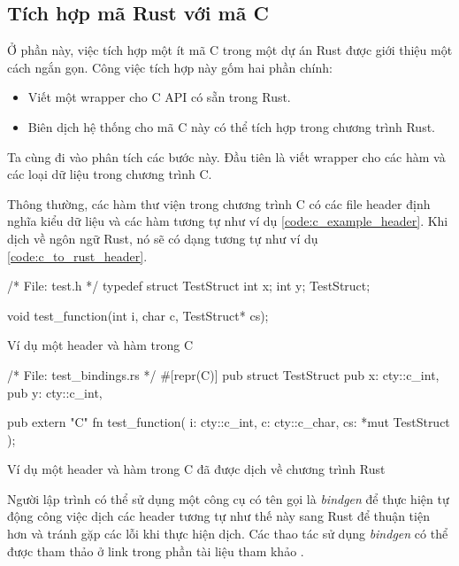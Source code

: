 \subsection{Tích hợp mã Rust với mã C}
Ở phần này, việc tích hợp một ít mã C trong một dự án Rust được giới thiệu một cách ngắn gọn.
Công việc tích hợp này gốm hai phần chính:
\begin{itemize}
\item Viết một wrapper cho C API có sẵn trong Rust.
\item Biên dịch hệ thống cho mã C này có thể tích hợp trong chương trình Rust.
\end{itemize}

Ta cùng đi vào phân tích các bước này.
Đầu tiên là viết wrapper cho các hàm và các loại dữ liệu trong chương trình C.

Thông thường, các hàm thư viện trong chương trình C có các file header định nghĩa kiểu dữ liệu và các hàm tương tự như ví dụ \ref{code:c_example_header}.
Khi dịch về ngôn ngữ Rust, nó sẽ có dạng tương tự như ví dụ \ref{code:c_to_rust_header}.
\begin{listing}
\begin{ccode}
/* File: test.h */
typedef struct TestStruct {
    int x;
    int y;
} TestStruct;

void test_function(int i, char c, TestStruct* cs);
\end{ccode}
\caption{Ví dụ một header và hàm trong C}
\label{code:c_example_header}
\end{listing}

\begin{listing}
\begin{rustcode}
/* File: test_bindings.rs */
#[repr(C)]
pub struct TestStruct {
    pub x: cty::c_int,
    pub y: cty::c_int,
}

pub extern "C" fn test_function(
    i: cty::c_int,
    c: cty::c_char,
    cs: *mut TestStruct
);
\end{rustcode}
\caption{Ví dụ một header và hàm trong C đã được dịch về chương trình Rust}
\label{code:c_to_rust_header}
\end{listing}

Người lập trình có thể sử dụng một công cụ có tên gọi là \emph{bindgen} để thực hiện tự động công việc dịch các header tương tự như thế này sang Rust để thuận tiện hơn và tránh gặp các lỗi khi thực hiện dịch.
Các thao tác sử dụng \emph{bindgen} có thể được tham thảo ở link trong phần tài liệu tham khảo \cite{rust_action, rust2018book, rust_embedded_c}.

